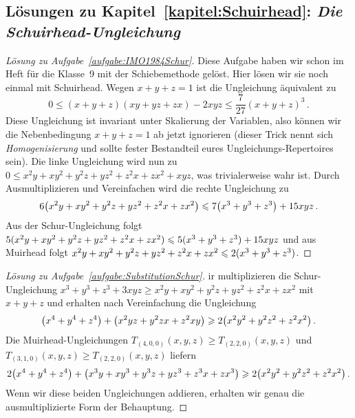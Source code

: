 \subsection*{Lösungen zu Kapitel~\ref{kapitel:Schuirhead}: \emph{Die Schuirhead-Ungleichung}}
\begin{proof}[Lösung zu Aufgabe~\ref{aufgabe:IMO1984Schur}]
	Diese Aufgabe haben wir schon im Heft für die Klasse~9 mit der Schiebemethode gelöst. Hier lösen wir sie noch einmal mit Schuirhead. Wegen $x+y+z=1$ ist die Ungleichung äquivalent zu
	\begin{equation*}
		0\leqslant (x+y+z)(xy+yz+zx)-2xyz\leqslant\frac{7}{27}(x+y+z)^3\,.
	\end{equation*}
	Diese Ungleichung ist invariant unter Skalierung der Variablen, also können wir die Nebenbedingung $x+y+z=1$ ab jetzt ignorieren (dieser Trick nennt sich \emph{Homogenisierung} und sollte fester Bestandteil eures Ungleichungs-Repertoires sein). Die linke Ungleichung wird nun zu $0\leqslant x^2y+xy^2+y^2z+yz^2+z^2x+zx^2+xyz$, was trivialerweise wahr ist. Durch Ausmultiplizieren und Vereinfachen wird die rechte Ungleichung zu
	\begin{equation*}
		6\parens*{x^2y+xy^2+y^2z+yz^2+z^2x+zx^2}\leqslant 7\parens*{x^3+y^3+z^3}+15xyz\,.
	\end{equation*}
	Aus der Schur-Ungleichung folgt $5\lparen x^2y+xy^2+y^2z+yz^2+z^2x+zx^2\rparen\leqslant 5\lparen x^3+y^3+z^3\rparen+15xyz$ und aus Muirhead folgt $x^2y+xy^2+y^2z+yz^2+z^2x+zx^2\leqslant 2\lparen x^3+y^3+z^3\rparen$.
\end{proof}

\begin{proof}[Lösung zu Aufgabe~\ref{aufgabe:SubstitutionSchur}]
	ir multiplizieren die Schur-Ungleichung $x^3+y^3+z^3+3xyz\geqslant x^2y+xy^2+y^2z+yz^2+z^2x+zx^2$ mit $x+y+z$ und erhalten nach Vereinfachung die Ungleichung
	\begin{equation*}
		\parens*{x^4+y^4+z^4}+\parens*{x^2yz+y^2zx+z^2xy}\geqslant 2\parens*{x^2y^2+y^2z^2+z^2x^2}\,.
	\end{equation*}
	Die Muirhead-Ungleichungen $T_{(4,0,0)}(x,y,z)\geqslant T_{(2,2,0)}(x,y,z)$ und $T_{(3,1,0)}(x,y,z)\geqslant T_{(2,2,0)}(x,y,z)$ liefern
	\begin{equation*}
		2\parens*{x^4+y^4+z^4}+\parens*{x^3y+xy^3+y^3z+yz^3+z^3x+zx^3}\geqslant 2\parens*{x^2y^2+y^2z^2+z^2x^2}\,.
	\end{equation*}
	Wenn wir diese beiden Ungleichungen addieren, erhalten wir genau die ausmultiplizierte Form der Behauptung.
\end{proof}